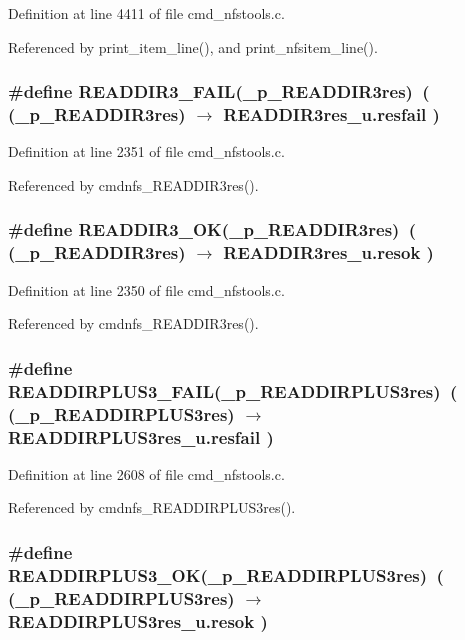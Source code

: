 Definition at line 4411 of file cmd\_\-nfstools.c.

Referenced by print\_\-item\_\-line(), and print\_\-nfsitem\_\-line().
\subsubsection{\setlength{\rightskip}{0pt plus 5cm}\#define READDIR3\_\-FAIL(\_\-p\_\-READDIR3res)\ ( (\_\-p\_\-READDIR3res) $\rightarrow$ READDIR3res\_\-u.resfail )}\label{cmd__nfstools_8c_a14}




Definition at line 2351 of file cmd\_\-nfstools.c.

Referenced by cmdnfs\_\-READDIR3res().
\subsubsection{\setlength{\rightskip}{0pt plus 5cm}\#define READDIR3\_\-OK(\_\-p\_\-READDIR3res)\ ( (\_\-p\_\-READDIR3res) $\rightarrow$ READDIR3res\_\-u.resok )}\label{cmd__nfstools_8c_a13}




Definition at line 2350 of file cmd\_\-nfstools.c.

Referenced by cmdnfs\_\-READDIR3res().
\subsubsection{\setlength{\rightskip}{0pt plus 5cm}\#define READDIRPLUS3\_\-FAIL(\_\-p\_\-READDIRPLUS3res)\ ( (\_\-p\_\-READDIRPLUS3res) $\rightarrow$ READDIRPLUS3res\_\-u.resfail )}\label{cmd__nfstools_8c_a16}




Definition at line 2608 of file cmd\_\-nfstools.c.

Referenced by cmdnfs\_\-READDIRPLUS3res().
\subsubsection{\setlength{\rightskip}{0pt plus 5cm}\#define READDIRPLUS3\_\-OK(\_\-p\_\-READDIRPLUS3res)\ ( (\_\-p\_\-READDIRPLUS3res) $\rightarrow$ READDIRPLUS3res\_\-u.resok )}\label{cmd__nfstools_8c_a15}




